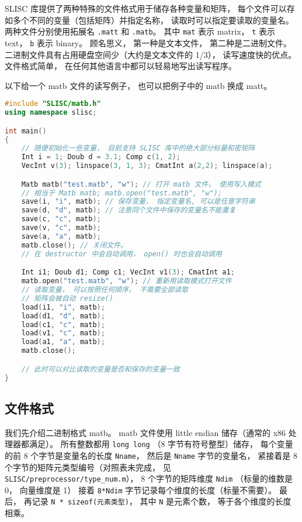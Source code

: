 
\begin{issues}
\issueTODO
\end{issues}


SLISC 库提供了两种特殊的文件格式用于储存各种变量和矩阵， 每个文件可以存如多个不同的变量（包括矩阵）并指定名称， 读取时可以指定要读取的变量名。 两种文件分别使用拓展名 \verb`.matt` 和 \verb`.matb`。 其中 \verb`mat` 表示 matrix， \verb`t` 表示 text， \verb`b` 表示 binary。 顾名思义， 第一种是文本文件， 第二种是二进制文件。 二进制文件具有占用硬盘空间少（大约是文本文件的 1/3）， 读写速度快的优点。 文件格式简单， 在任何其他语言中都可以轻易地写出读写程序。

以下给一个 matb 文件的读写例子， 也可以把例子中的 matb 换成 matt。

\begin{lstlisting}[language=cpp]
#include "SLISC/matb.h"
using namespace slisc;

int main()
{
    // 随便初始化一些变量， 目前支持 SLISC 库中的绝大部分标量和密矩阵
    Int i = 1; Doub d = 3.1; Comp c(1, 2);
    VecInt v(3); linspace(3, 1, 3); CmatInt a(2,2); linspace(a);

    Matb matb("test.matb", "w"); // 打开 matb 文件， 使用写入模式
    // 相当于 Matb matb; matb.open("test.matb", "w");
    save(i, "i", matb); // 保存变量， 指定变量名, 可以是任意字符串
    save(d, "d", matb); // 注意同个文件中保存的变量名不能重复
    save(c, "c", matb);
    save(v, "c", matb);
    save(a, "a", matb);
    matb.close(); // 关闭文件。
    // 在 destructor 中会自动调用， open() 时也会自动调用

    Int i1; Doub d1; Comp c1; VecInt v1(3); CmatInt a1;
    matb.open("test.matb", "w"); // 重新用读取模式打开文件
    // 读取变量， 可以按照任何顺序， 不需要全部读取
    // 矩阵会被自动 resize()
    load(i1, "i", matb); 
    load(d1, "d", matb);
    load(c1, "c", matb);
    load(v1, "c", matb);
    load(a1, "a", matb);
    matb.close();

    // 此时可以对比读取的变量是否和保存的变量一致
}
\end{lstlisting}

\subsection{文件格式}
我们先介绍二进制格式 matb。 matb 文件使用 little endian 储存（通常的 x86 处理器都满足）。%
所有整数都用 \verb`long long` （8 字节有符号整型）储存，  每个变量的前 8 个字节是变量名的长度 \verb`Nname`， 然后是 \verb`Nname` 字节的变量名， 紧接着是 8 个字节的矩阵元类型编号（对照表未完成， 见 \verb`SLISC/preprocessor/type_num.m`）， 8 个字节的矩阵维度 \verb`Ndim` （标量的维数是 0， 向量维度是 1） 接着 \verb`8*Ndim` 字节记录每个维度的长度（标量不需要）。 最后， 再记录 \verb`N * sizeof(元素类型)`， 其中 \verb`N` 是元素个数， 等于各个维度的长度相乘。

